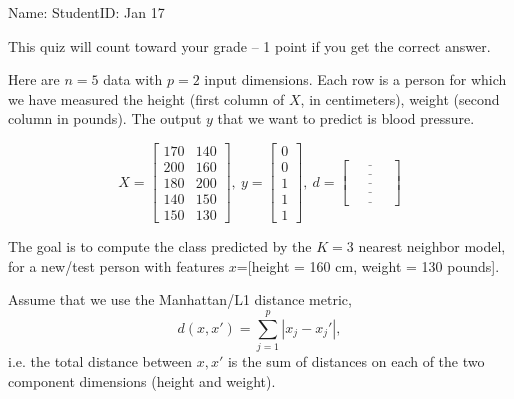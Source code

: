 \documentclass{article}
\begin{document}
\thispagestyle{empty}

Name: \underline{\hspace{2in}} StudentID: \underline{\hspace{2in}} Jan 17 

This quiz will count toward your grade -- 1 point if you get the
correct answer.

Here are $n=5$ data with $p=2$ input dimensions. Each row is a person
for which we have measured the height (first column of $X$, in
centimeters), weight (second column in pounds). The output $y$ that we
want to predict is blood pressure.

\begin{equation*}
  X = \left[\begin{array}{cc}
              170 & 140 \\
              200 & 160 \\
              180 & 200 \\
              140 & 150 \\
              150 & 130
\end{array}\right],\ 
  y = \left[\begin{array}{c}
              0 \\
              0 \\
              1 \\
              1 \\
              1
\end{array}\right],\ 
  d = \left[\begin{array}{c}
              \underline{\hspace{1cm}}\\
              \underline{\hspace{1cm}}\\
              \underline{\hspace{1cm}}\\
              \underline{\hspace{1cm}}\\
              \underline{\hspace{1cm}}
\end{array}\right]
\end{equation*}

The goal is to compute the class predicted by the $K=3$ nearest
neighbor model, for a new/test person with features $x$=[height = 160 cm,
weight = 130 pounds].

Assume that we use the Manhattan/L1 distance metric, 
\begin{equation*}
  d(x,x') = \sum_{j=1}^p |x_j-x_j'|,
\end{equation*}
i.e. the total distance between $x,x'$ is the sum of distances on each
of the two component dimensions (height and weight).
\end{document}

